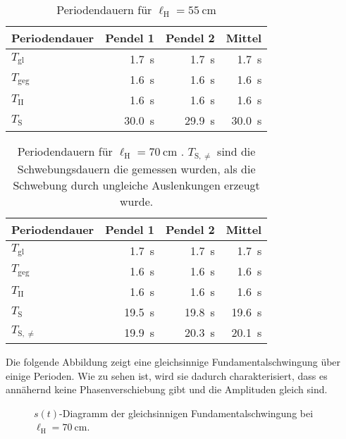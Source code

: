 \documentclass[
12pt,
a4paper,
bibliography=totocnumbered, %
BCOR=1cm, %
oneside, %
]{scrartcl}
\newcommand{\lh}{\ell_{\mathrm{H}}}
\begin{document}
\begin{table}[H]
		\caption{Periodendauern für \(\lh = \qty{55}{\centi\meter}\) \label{tbl:res55}}
	\begin{tabular*}{\textwidth}{@{\extracolsep{\fill}}@{\hspace{5pt}}lrrr@{\hspace{5pt}}}
		\toprule
		Periodendauer & Pendel 1 & Pendel 2 & Mittel\\
		\midrule
		\(T_{\text{gl}}\) & \qty{1,7}{\second} & \qty{1,7}{\second} & \qty{1,7}{\second}\\
		\(T_{\text{geg}}\) & \qty{1,6}{\second} & \qty{1,6}{\second} & \qty{1,6}{\second}\\
		\(T_{\text{II}}\) & \qty{1,6}{\second} & \qty{1,6}{\second} & \qty{1,6}{\second}\\
		\(T_{\text{S}}\) & \qty{30,0}{\second} & \qty{29,9}{\second} & \qty{30,0}{\second} \\
		\bottomrule
	\end{tabular*}
\end{table}

\begin{table}[H]
		\caption{Periodendauern für \(\lh = \qty{70}{\centi\meter}\) \label{tbl:res70}. \(T_{\text{S},≠}\) sind die Schwebungsdauern die gemessen wurden, als die Schwebung durch ungleiche Auslenkungen erzeugt wurde.}
	\begin{tabular*}{\textwidth}{@{\extracolsep{\fill}}@{\hspace{5pt}}lrrr@{\hspace{5pt}}}
		\toprule
		Periodendauer & Pendel 1 & Pendel 2 & Mittel\\
		\midrule
		\(T_{\text{gl}}\) & \qty{1,7}{\second} & \qty{1,7}{\second} & \qty{1,7}{\second}\\
		\(T_{\text{geg}}\) & \qty{1,6}{\second} & \qty{1,6}{\second} & \qty{1,6}{\second}\\
		\(T_{\text{II}}\) & \qty{1,6}{\second} & \qty{1,6}{\second} & \qty{1,6}{\second}\\
		\(T_{\text{S}}\) & \qty{19,5}{\second} & \qty{19,8}{\second} & \qty{19,6}{\second} \\
		\(T_{\text{S},≠}\) & \qty{19,9}{\second} & \qty{20,3}{\second} & \qty{20,1}{\second}\\
		\bottomrule
	\end{tabular*}
\end{table}

Die folgende Abbildung zeigt eine gleichsinnige Fundamentalschwingung über einige Perioden. Wie zu sehen ist, wird sie dadurch charakterisiert, dass es annähernd keine Phasenverschiebung gibt und die Amplituden gleich sind.
\begin{figure}[H]
	\caption{\(s(t)\)-Diagramm der gleichsinnigen Fundamentalschwingung bei \(\lh = \qty{70}{\centi\meter}\).}
	\label{fig:gl70}
\end{figure}
\end{document}
